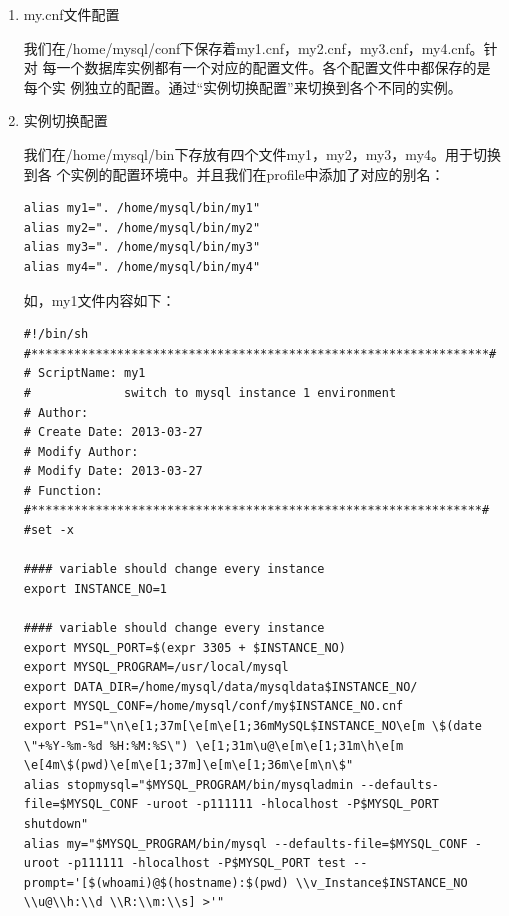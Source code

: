 \begin{enumerate}[itemsep=0pt,parsep=0pt]
\item my.cnf文件配置

  我们在/home/mysql/conf下保存着my1.cnf，my2.cnf，my3.cnf，my4.cnf。针对
  每一个数据库实例都有一个对应的配置文件。各个配置文件中都保存的是每个实
  例独立的配置。通过“实例切换配置”来切换到各个不同的实例。

\item 实例切换配置

  我们在/home/mysql/bin下存放有四个文件my1，my2，my3，my4。用于切换到各
  个实例的配置环境中。并且我们在profile中添加了对应的别名：

\begin{verbatim}
alias my1=". /home/mysql/bin/my1"
alias my2=". /home/mysql/bin/my2"
alias my3=". /home/mysql/bin/my3"
alias my4=". /home/mysql/bin/my4"
\end{verbatim}

  如，my1文件内容如下：

\begin{verbatim}
#!/bin/sh
#****************************************************************#
# ScriptName: my1
#             switch to mysql instance 1 environment
# Author:
# Create Date: 2013-03-27
# Modify Author:
# Modify Date: 2013-03-27
# Function:
#***************************************************************#
#set -x

#### variable should change every instance
export INSTANCE_NO=1

#### variable should change every instance
export MYSQL_PORT=$(expr 3305 + $INSTANCE_NO)
export MYSQL_PROGRAM=/usr/local/mysql
export DATA_DIR=/home/mysql/data/mysqldata$INSTANCE_NO/
export MYSQL_CONF=/home/mysql/conf/my$INSTANCE_NO.cnf
export PS1="\n\e[1;37m[\e[m\e[1;36mMySQL$INSTANCE_NO\e[m \$(date \"+%Y-%m-%d %H:%M:%S\") \e[1;31m\u@\e[m\e[1;31m\h\e[m \e[4m\$(pwd)\e[m\e[1;37m]\e[m\e[1;36m\e[m\n\$"
alias stopmysql="$MYSQL_PROGRAM/bin/mysqladmin --defaults-file=$MYSQL_CONF -uroot -p111111 -hlocalhost -P$MYSQL_PORT shutdown"
alias my="$MYSQL_PROGRAM/bin/mysql --defaults-file=$MYSQL_CONF -uroot -p111111 -hlocalhost -P$MYSQL_PORT test --prompt='[$(whoami)@$(hostname):$(pwd) \\v_Instance$INSTANCE_NO \\u@\\h:\\d \\R:\\m:\\s] >'"


\end{verbatim}
\end{enumerate}
